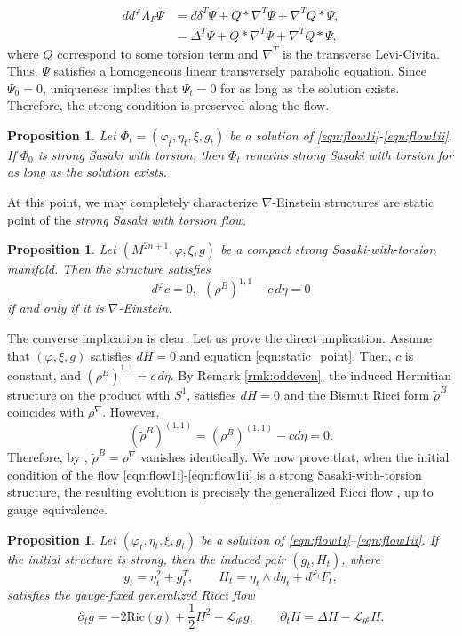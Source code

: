 \documentclass{article}
\makeatletter
\renewenvironment{proof}[1][\proofname]{%
  \par\pushQED{\qed}%
  \normalfont\topsep6\p@\@plus6\p@\relax
  \trivlist
  \item[\hskip\labelsep
        \textbf{\textup{#1}}\@addpunct{.}]\ignorespaces
}{%
  \popQED\endtrivlist\@endpefalse
}
\newtheorem{prop}[thm]{Proposition}
\theoremstyle{definition}
\newcommand{\Ric}{\mathrm{Ric}}
\renewcommand{\phi}{\varphi}
\numberwithin{equation}{section}
\makeatother
\begin{document}
\begin{align*}
dd^\phi\Lambda_F\Psi
&=
d \delta^T \Psi
 + Q*\nabla^T \Psi+\nabla^T Q * \Psi,\\
&= \Delta^T \Psi + Q*\nabla^T \Psi+\nabla^T Q * \Psi,
\end{align*}
where $Q$ correspond to some torsion term and $\nabla^T$ is the transverse Levi-Civita. 
Thus, $\Psi$ satisfies a homogeneous linear
transversely parabolic equation. Since $\Psi_0=0$, uniqueness implies
that $\Psi_t=0$ for as long as the solution exists. Therefore, the strong condition
is preserved along the flow.
\begin{prop}\label{prop:SST-preserved}
Let
$\Phi_t=(\phi_t,\eta_t,\xi,g_t)$
be a solution of \eqref{eqn:flow1i}-\eqref{eqn:flow1ii}. If $\Phi_0$ is strong Sasaki with torsion, then $\Phi_t$ remains strong Sasaki with torsion for as long as the solution exists.
\end{prop}
At this point, we may completely characterize $\nabla$-Einstein structures are static point of the \emph{strong Sasaki with torsion flow}.
\begin{prop}
Let $(M^{2n+1},\phi,\xi,g)$ be a compact strong
Sasaki-with-torsion manifold. Then the structure satisfies 
\begin{equation} \label{eqn:static_point}
d^\phi c=0, \ \ (\rho^B)^{1,1}-c \, d\eta=0
\end{equation}
if and only if it is $\nabla$-Einstein.
\end{prop}
\begin{proof}
The converse implication is clear. Let us prove the direct implication. Assume that $(\phi,\xi,g)$ satisfies $dH=0$ and equation \eqref{eqn:static_point}.
Then, $c$ is constant, and $(\rho^B)^{1,1}=c \, d\eta$. By Remark \ref{rmk:oddeven}, the induced Hermitian structure on the product with $S^1$, satisfies $dH=0$ and the Bismut Ricci form $\tilde \rho^B$ coincides with $\rho^\nabla$. However, 
\[
(\tilde \rho^B)^{(1,1)}= (\rho^B)^{(1,1)}-c d\eta=0.
\]
Therefore, by \cite{Ye}, $\tilde \rho^B=\rho^\nabla$ vanishes identically.
\end{proof}
We now prove that, when the initial condition of the flow \eqref{eqn:flow1i}-\eqref{eqn:flow1ii} is a strong Sasaki-with-torsion structure, the resulting evolution is precisely the generalized Ricci flow \cite{GFStr}, up to gauge equivalence. 
\begin{prop} \label{prop:stationary_sst}
Let $(\phi_t,\eta_t,\xi,g_t)$ be a solution of
\eqref{eqn:flow1i}--\eqref{eqn:flow1ii}.
If the initial structure is strong, then the induced pair $(g_t,H_t)$,
where
\[
g_t=\eta_t^2+g_t^T,
\qquad
H_t=\eta_t\wedge d\eta_t+d^{\phi_t}F_t,
\]
satisfies the gauge-fixed generalized Ricci flow
\[
\partial_tg
=
-2 \Ric(g)+\frac12H^2-\mathcal L_{\theta^\sharp}g,
\qquad
\partial_tH
=
\Delta H-\mathcal L_{\theta^\sharp}H.
\]

\end{prop}
\end{document}
